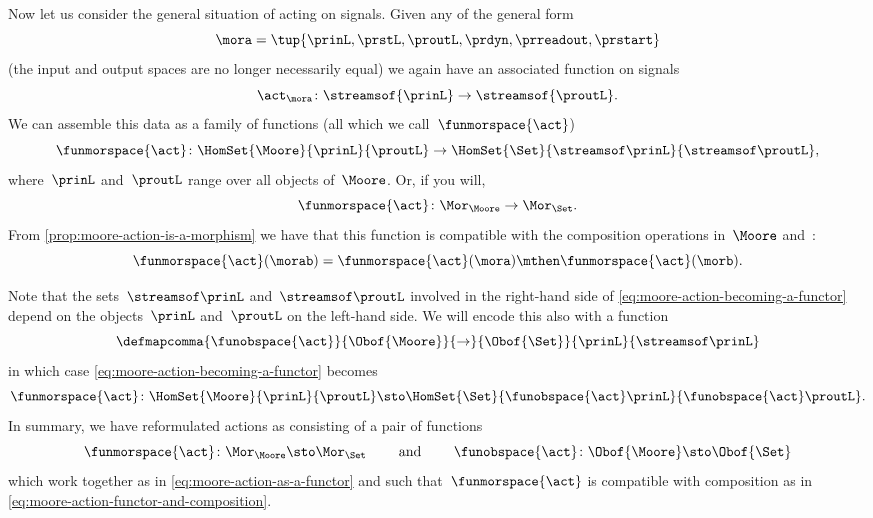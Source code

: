 Now let us consider the general situation of  acting on signals.
Given any  of the general form
\begin{equation}
    \mora = \tup{\prinL,\prstL,\proutL,\prdyn,\prreadout,\prstart}
\end{equation}
(the input and output spaces are no longer necessarily equal) we again have an associated function on signals
\begin{equation}
    \act_{\mora} \colon \streamsof{\prinL} \to \streamsof {\proutL}.
\end{equation}
We can assemble this data as a family of functions (all which we call~$\funmorspace{\act}$)
\begin{equation}
    \label{eq:moore-action-becoming-a-functor}
    \funmorspace{\act} \colon  \HomSet{\Moore}{\prinL}{\proutL} \to \HomSet{\Set}{\streamsof\prinL}{\streamsof\proutL},
\end{equation}
where~$\prinL$ and~$\proutL$ range over all objects of~$\Moore$.
Or, if you will,
\begin{equation}
    \funmorspace{\act} \colon \Mor_\Moore \to \Mor_\Set.
\end{equation}
From \cref{prop:moore-action-is-a-morphism} we have that this function is compatible with the composition operations in~$\Moore$ and~\Set:
\begin{equation}
    \label{eq:moore-action-functor-and-composition}
    \funmorspace{\act}(\morab) = \funmorspace{\act}(\mora) \mthen \funmorspace{\act}(\morb).
\end{equation}

Note that the sets~$\streamsof\prinL$ and~$\streamsof\proutL$ involved in the right-hand side of \cref{eq:moore-action-becoming-a-functor} depend on the objects~$\prinL$ and~$\proutL$ on the left-hand side.
We will encode this also with a function
\begin{equation}
    \defmapcomma{\funobspace{\act}}
    {\Obof{\Moore}}
    {\to}
    {\Obof{\Set}}
    {\prinL}
    {\streamsof\prinL}
\end{equation}
in which case \cref{eq:moore-action-becoming-a-functor} becomes
\begin{equation}
    \label{eq:moore-action-as-a-functor}
    \funmorspace{\act} \colon  \HomSet{\Moore}{\prinL}{\proutL} \sto \HomSet{\Set}{ \funobspace{\act}\prinL}{\funobspace{\act}\proutL}.
\end{equation}
%
In summary, we have reformulated  actions as consisting of a pair of functions
\begin{equation}
    \funmorspace{\act} \colon \Mor_\Moore \sto \Mor_\Set \qquad \text{ and } \qquad \funobspace{\act} \colon \Obof{\Moore} \sto \Obof{\Set}
\end{equation}
which work together as in \cref{eq:moore-action-as-a-functor} and such that~$\funmorspace{\act}$ is compatible with composition as in \cref{eq:moore-action-functor-and-composition}.

